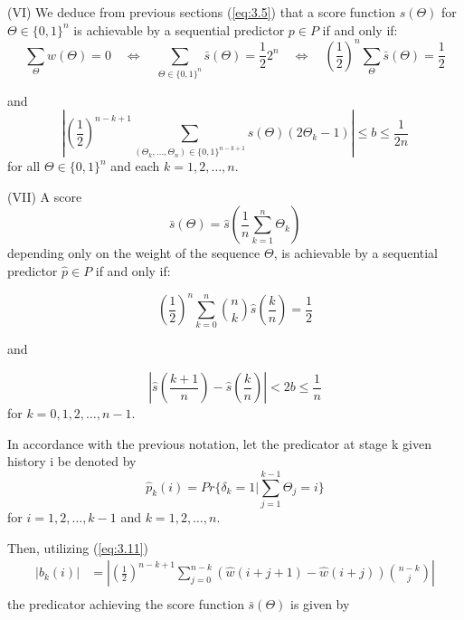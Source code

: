 \documentclass[11pt]{article}
\numberwithin{equation}{section}
\theoremstyle{boldStyle}
\begin{document}
(VI) We deduce from previous sections (\ref{eq:3.5}) that a score function $s(\Theta)$ for $\Theta \in \{0, 1\}^n$ is achievable by a sequential predictor
 $p \in P$ if and only if:
\begin{equation}
    \sum_{\Theta} w(\Theta) = 0 \quad 
    \iff \quad \sum_{\Theta \in \{0, 1\}^n} \bar{s}(\Theta) = \frac{1}{2}  2^n \quad 
    \iff \quad \left(\frac{1}{2}\right)^n \sum_{\Theta} \bar{s}(\Theta) = \frac{1}{2}
\end{equation}

and
\begin{equation}
    \left| \left(\frac{1}{2}\right)^{n-k+1} \sum_{(\Theta_k, \ldots, \Theta_n) \in \{0,1\}^{n-k+1}} s(\Theta) (2\Theta_k - 1) \right| \leq b \leq \frac{1}{2n}
\end{equation}
for all $\Theta \in \{0, 1\}^n$ and each $k = 1, 2, \ldots, n$.


\bigbreak

(VII) A score 
\begin{equation}
    \bar{s}(\Theta) = \hat{s}\left(\frac{1}{n} \sum_{k=1}^n \Theta_k \right)
\end{equation}
depending only on the weight of the sequence $\Theta$, is achievable by a sequential predictor $\hat{p} \in P$ if and only if:

\begin{equation}
    \left(\frac{1}{2}\right)^n \sum_{k=0}^n \binom{n}{k} \hat{s} \left(\frac{k}{n}\right) = \frac{1}{2}
\end{equation}

and

\begin{equation}
    \left| \hat{s} \left(\frac{k+1}{n}\right) - \hat{s} \left(\frac{k}{n}\right) \right| < 2b \leq \frac{1}{n}
\end{equation}
for $k = 0, 1, 2, \ldots, n-1$.

\bigbreak

In accordance with the previous notation, let the predicator at stage k given history i be denoted by 
\begin{equation}
    \hat{p}_k(i) = Pr \{ \delta_k = 1 | \sum_{j=1}^{k-1} \Theta_j = i \}
\end{equation}
for $i = 1, 2, \ldots, k-1$ and $k = 1, 2, \ldots, n$.

Then, utilizing (\ref{eq:3.11}) 
\begin{equation*}
    \begin{aligned}
        \left| b_k(i) \right| &= 
        \left| \left(\frac{1}{2}\right)^{n-k+1} \sum_{j=0}^{n-k} \left( \hat{w} \left( i+j+1 \right) - \hat{w} \left( i+j \right) \right) \binom{n-k}{j} \right| \\
    \end{aligned}
\end{equation*}
the predicator achieving the score function $\bar{s}(\Theta)$ is given by 
\end{document}
